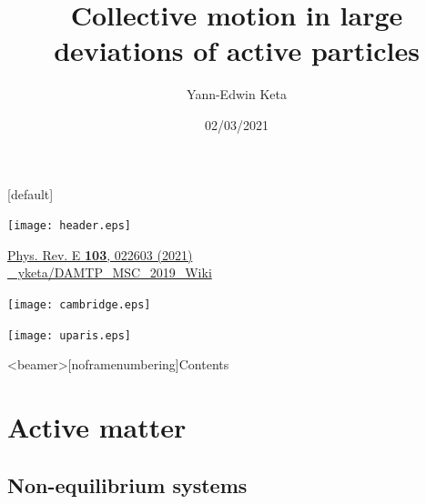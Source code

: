 \documentclass{beamer}
\title{Collective motion in large deviations of active particles}
\author{Yann-Edwin Keta}
\date{02/03/2021}
\begin{document}

{
\makeatletter
    [default]
    \def\beamer@entrycode{\vspace*{-\headheight}}
\begin{frame}[noframenumbering]

\vspace*{-4mm}
{
 \hspace*{-\beamerleftmargin}%
\begin{minipage}{\paperwidth}
\texttt{[image: header.eps]}
\end{minipage}
}

\titlepage

\vspace{-20pt}
\begin{center}
{\href{https://doi.org/10.1103/PhysRevE.103.022603}{Phys. Rev. E \textbf{103}, 022603 (2021)}}\\
\href{https://github.com/yketa/DAMTP_MSC_2019_Wiki}{\footnotesize \faGithub~ yketa/DAMTP\_MSC\_2019\_Wiki}
\end{center}

\hfill
\begin{minipage}{0.5\linewidth}
\centering
\texttt{[image: cambridge.eps]}
\end{minipage}
\hfill
\begin{minipage}{0.42\linewidth}
\centering
\texttt{[image: uparis.eps]}
\end{minipage}
\hfill

\end{frame}
}


{\footerwithoutframenumber
\begin{frame}<beamer>[noframenumbering]{Contents}
  \tableofcontents
\end{frame}
}


\section{Active matter}

\subsection{Non-equilibrium systems}
\end{document}
